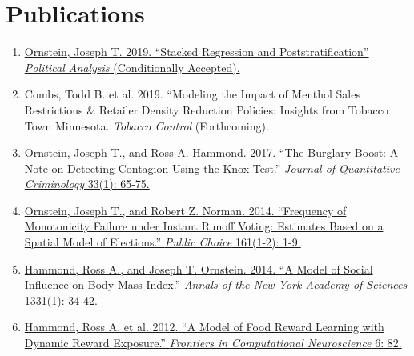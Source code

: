 \documentclass[letterpaper]{article}
\begin{document}
\hrulefill

\section*{Publications}
\begin{enumerate}
\item \href{https://joeornstein.github.io/SRP.html}{Ornstein, Joseph T. 2019. ``Stacked Regression and Poststratification'' \textit{Political Analysis} (Conditionally Accepted).} 
\item Combs, Todd B. et al. 2019. ``Modeling the Impact of Menthol Sales Restrictions \& Retailer Density Reduction Policies: Insights from Tobacco Town Minnesota. \textit{Tobacco Control} (Forthcoming).
\item \href{https://joeornstein.github.io/papers/Ornstein-Hammond2017.pdf}{Ornstein, Joseph T., and Ross A. Hammond. 2017. ``The Burglary Boost: A Note on Detecting Contagion Using the Knox Test.'' \textit{Journal of Quantitative Criminology} 33(1): 65-75.}
\item \href{https://joeornstein.github.io/MonotonicityFailure.html}{Ornstein, Joseph T., and Robert Z. Norman. 2014. ``Frequency of Monotonicity Failure under Instant Runoff Voting: Estimates Based on a Spatial Model of Elections.'' \textit{Public Choice} 161(1-2): 1-9.}
\item \href{https://joeornstein.github.io/papers/Hammond_et_al-2014-Annals_of_the_New_York_Academy_of_Sciences.pdf}{Hammond, Ross A., and Joseph T. Ornstein. 2014. ``A Model of Social Influence on Body Mass Index.'' \textit{Annals of the New York Academy of Sciences} 1331(1): 34-42.}
\item \href{https://joeornstein.github.io/papers/Hammond-2012.pdf}{Hammond, Ross A. et al. 2012. ``A Model of Food Reward Learning with Dynamic Reward Exposure.'' \textit{Frontiers in Computational Neuroscience} 6: 82.}
\end{enumerate}

\hrulefill
\end{document}
